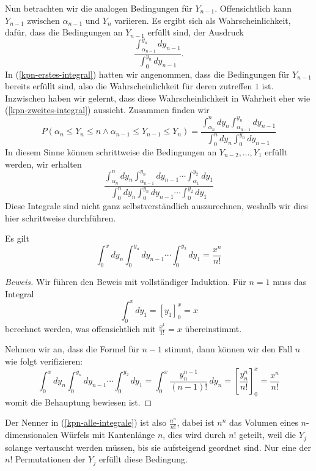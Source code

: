 Nun betrachten wir die analogen Bedingungen für $Y_{n-1}$.
Offensichtlich kann $Y_{n-1}$ zwischen $\alpha_{n-1}$ und $Y_n$ variieren.
Es ergibt sich
als Wahrscheinlichkeit, dafür, dass die Bedingungen an $Y_{n-1}$ erfüllt
sind, der Ausdruck
\begin{equation}
\frac{\int_{\alpha_{n-1}}^{y_n}dy_{n-1}}{\int_0^{y_n}dy_{n-1}}.
\label{kpn-zweites-integral}
\end{equation}
In (\ref{kpn-erstes-integral}) hatten wir angenommen,
dass die Bedingungen für $Y_{n-1}$
bereits erfüllt sind, also die Wahrscheinlichkeit für deren zutreffen $1$
ist. Inzwischen haben wir gelernt, dass diese Wahrscheinlichkeit in
Wahrheit eher wie (\ref{kpn-zweites-integral}) aussieht.
Zusammen finden wir
\begin{equation}
P(\alpha_n\le Y_n\le n\wedge \alpha_{n-1}\le Y_{n-1}\le Y_n)
=
\frac{\int_{\alpha_n}^n dy_n\int_{\alpha_{n-1}}^{y_n}dy_{n-1}}{\int_0^ndy_n\int_0^{y_n}dy_{n-1}}
\label{kpn-zwei-integrale}
\end{equation}
In diesem Sinne können schrittweise die Bedingungen an $Y_{n-2},\dots,Y_1$
erfüllt werden, wir erhalten
\begin{equation}
\frac{\int_{\alpha_n}^n dy_n\int_{\alpha_{n-1}}^{y_n}dy_{n-1}\dotsi\int_{\alpha_1}^{y_2}dy_1}{\int_0^ndy_n\int_0^{y_n}dy_{n-1}\dotsi\int_0^{y_2}dy_1}
\label{kpn-alle-integrale}
\end{equation}
Diese Integrale sind nicht ganz selbstverständlich auszurechnen, weshalb
wir dies hier schrittweise durchführen.

\begin{satz}
\label{kn-elementarvolumen}
Es gilt
\begin{equation}
\int_0^xdy_n\int_0^{y_n}dy_{n-1}\dotsi\int_0^{y_2}dy_1=\frac{x^n}{n!}
\end{equation}
\end{satz}
\begin{proof}[Beweis] Wir führen den Beweis mit vollständiger
Induktion.
Für $n=1$ muss das Integral
\[
\int_0^xdy_1=[y_1]_0^x=x
\]
berechnet werden, was offensichtlich mit $\frac{x^1}{1!}=x$
übereinstimmt.

Nehmen wir an, dass die Formel für $n-1$ stimmt, dann können wir den
Fall $n$ wie folgt verifizieren:
\[
\int_0^xdy_n\int_0^{y_n}dy_{n-1}\dotsi\int_0^{y_2}dy_1
=
\int_0^x\frac{y_n^{n-1}}{(n-1)!}\,dy_n
=
\left[\frac{y_n^n}{n!}\right]_0^x=\frac{x^n}{n!}
\]
womit die Behauptung bewiesen ist.
\end{proof}
Der Nenner in (\ref{kpn-alle-integrale}) ist also $\frac{n^n}{n!}$,
dabei ist $n^n$ das
Volumen eines $n$-dimensionalen Würfels mit Kantenlänge $n$, dies wird
durch $n!$ geteilt, weil die $Y_j$ solange vertauscht werden müssen, bis
sie aufsteigend geordnet sind.
Nur eine der $n!$ Permutationen der $Y_j$
erfüllt diese Bedingung.

